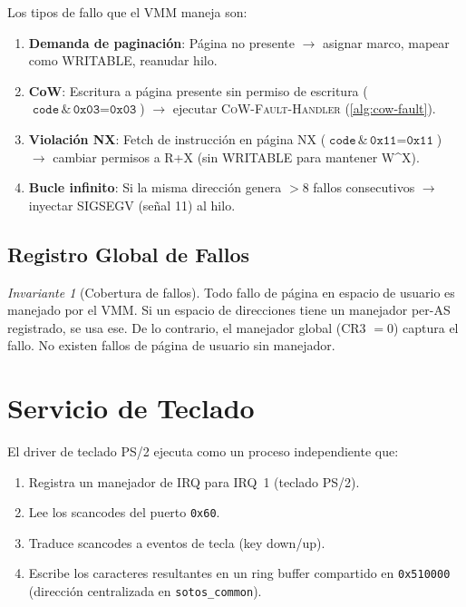 \documentclass[11pt,twoside,openright]{book}
\theoremstyle{definition}
\theoremstyle{plain}
\theoremstyle{remark}
\newtheorem{invariant}{Invariante}[chapter]
\begin{document}
Los tipos de fallo que el VMM maneja son:

\begin{enumerate}
    \item \textbf{Demanda de paginación}: Página no presente $\to$ asignar marco,
          mapear como WRITABLE, reanudar hilo.
    \item \textbf{CoW}: Escritura a página presente sin permiso de escritura
          ($\texttt{code} \,\texttt{\&}\, \texttt{0x03} = \texttt{0x03}$) $\to$
          ejecutar \textsc{CoW-Fault-Handler} (\cref{alg:cow-fault}).
    \item \textbf{Violación NX}: Fetch de instrucción en página NX
          ($\texttt{code} \,\texttt{\&}\, \texttt{0x11} = \texttt{0x11}$) $\to$
          cambiar permisos a R+X (sin WRITABLE para mantener W\^{}X).
    \item \textbf{Bucle infinito}: Si la misma dirección genera $> 8$ fallos
          consecutivos $\to$ inyectar SIGSEGV (señal 11) al hilo.
\end{enumerate}

\subsection{Registro Global de Fallos}

\begin{invariant}[Cobertura de fallos]
Todo fallo de página en espacio de usuario es manejado por el VMM. Si un
espacio de direcciones tiene un manejador per-AS registrado, se usa ese.
De lo contrario, el manejador global (CR3 $= 0$) captura el fallo. No
existen fallos de página de usuario sin manejador.
\end{invariant}

\section{Servicio de Teclado}
\label{sec:kbd-service}

El driver de teclado PS/2 ejecuta como un proceso independiente que:
\begin{enumerate}
    \item Registra un manejador de IRQ para IRQ~1 (teclado PS/2).
    \item Lee los scancodes del puerto \texttt{0x60}.
    \item Traduce scancodes a eventos de tecla (key down/up).
    \item Escribe los caracteres resultantes en un ring buffer compartido
          en \texttt{0x510000} (dirección centralizada en \texttt{sotos\_common}).
\end{enumerate}
\end{document}
